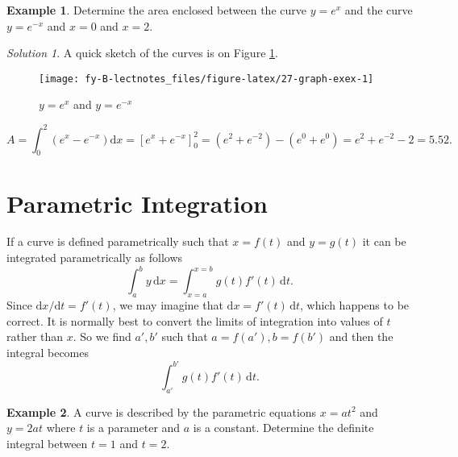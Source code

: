 \documentclass[
  english,
  11pt,
  oneside]{book}
\newcommand{\slide}{}
\theoremstyle{definition}
\theoremstyle{definition}
\newtheorem{example}{Example}[chapter]
\theoremstyle{definition}
\theoremstyle{definition}
\theoremstyle{remark}
\newtheorem*{solution}{Solution}
\begin{document}
\begin{example}
Determine the area enclosed between the curve \(y=e^x\) and the curve \(y=e^{-x}\) and \(x=0\) and \(x=2\).
\end{example}

\begin{solution}
\leavevmode

A quick sketch of the curves is on Figure \ref{fig:27-graph-exex}.

\begin{figure}

{\centering \texttt{[image: fy-B-lectnotes\_files/figure-latex/27-graph-exex-1]} 

}

\caption{$y=e^x$ and $y=e^{-x}$}\label{fig:27-graph-exex}
\end{figure}

\[
A = \int_0^2(e^x-e^{-x})\mathrm{d}x = \left[e^x+e^{-x}\right]_0^2 = (e^2+e^{-2})-(e^0+e^0) = e^2+e^{-2}-2=5.52.
\]

\end{solution}

\slide

\begin{slidesonly}

\hbox{}
\slide

\end{slidesonly}

\section{Parametric Integration}\label{parametric-integration}

If a curve is defined parametrically such that \(x = f(t)\) and \(y = g(t)\) it can be integrated parametrically as follows
\[
\int_a^b y\,\mathrm{d}x = \int_{x=a}^{x=b}g(t)f'(t)\,\mathrm{d}t.
\]
Since \(\mathrm{d}x/\mathrm{d}t = f'(t)\), we may imagine that \(\mathrm{d}x = f'(t)\,\mathrm{d}t\), which happens to be correct. It is normally best to convert the limits of integration into values of \(t\) rather than \(x\). So we find \(a', b'\) such that \(a=f(a'), b = f(b')\) and then the integral becomes
\[
\int_{a'}^{b'}g(t)f'(t)\,\mathrm{d}t.
\]
\slide

\begin{example}
A curve is described by the parametric equations \(x = at^2\) and \(y = 2at\) where \(t\) is a parameter and \(a\) is a constant. Determine the definite integral between \(t = 1\) and \(t = 2\).
\end{example}
\end{document}
